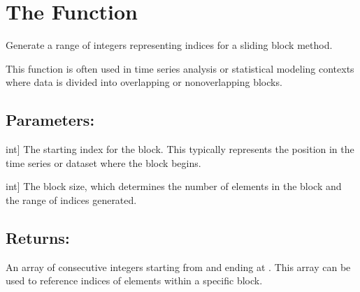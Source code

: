 \documentclass[a4paper,11pt,openany,english]{sphinxmanual}
\begin{document}
\section{The  Function}
\label{\detokenize{api_biascorrection:the-i-sb-function}}

\begin{fulllineitems}
\label{\detokenize{api_biascorrection:xtremes.biascorrection.I_sb}}
\pysigstartsignatures
{}
\pysigstopsignatures
\sphinxAtStartPar
Generate a range of integers representing indices for a sliding block method.

\sphinxAtStartPar
This function is often used in time series analysis or statistical modeling 
contexts where data is divided into overlapping or non\sphinxhyphen{}overlapping blocks.


\subsection{Parameters:}
\label{\detokenize{api_biascorrection:parameters}}\begin{description}
\sphinxlineitem{j}{[}int{]}
\sphinxAtStartPar
The starting index for the block. This typically represents the position 
in the time series or dataset where the block begins.

\sphinxlineitem{bs}{[}int{]}
\sphinxAtStartPar
The block size, which determines the number of elements in the block 
and the range of indices generated.

\end{description}


\subsection{Returns:}
\label{\detokenize{api_biascorrection:returns}}\begin{description}
\sphinxAtStartPar
An array of consecutive integers starting from  and ending at .
This array can be used to reference indices of elements within a specific block.

\end{description}



\end{fulllineitems}
\end{document}
